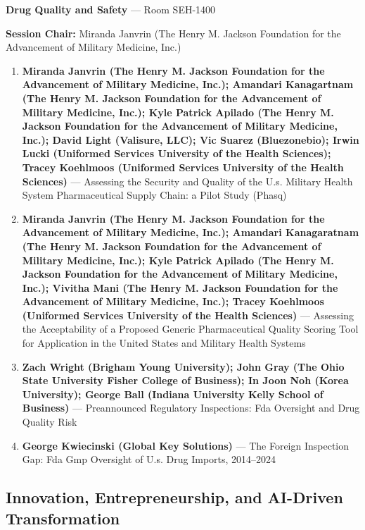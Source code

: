 \documentclass[
  10pt,
  letterpaper,
  DIV=11,
  numbers=noendperiod]{scrartcl}
\begin{document}
\textbf{Drug Quality and Safety} --- Room SEH-1400

\textbf{Session Chair:} Miranda Janvrin (The Henry M. Jackson Foundation
for the Advancement of Military Medicine, Inc.)

\begin{enumerate}
\def\labelenumi{\arabic{enumi}.}
\item
  \textbf{Miranda Janvrin (The Henry M. Jackson Foundation for the
  Advancement of Military Medicine, Inc.); Amandari Kanagartnam (The
  Henry M. Jackson Foundation for the Advancement of Military Medicine,
  Inc.); Kyle Patrick Apilado (The Henry M. Jackson Foundation for the
  Advancement of Military Medicine, Inc.); David Light (Valisure, LLC);
  Vic Suarez (Bluezonebio); Irwin Lucki (Uniformed Services University
  of the Health Sciences); Tracey Koehlmoos (Uniformed Services
  University of the Health Sciences)} --- Assessing the Security and
  Quality of the U.s. Military Health System Pharmaceutical Supply
  Chain: a Pilot Study (Phasq)
\item
  \textbf{Miranda Janvrin (The Henry M. Jackson Foundation for the
  Advancement of Military Medicine, Inc.); Amandari Kanagaratnam (The
  Henry M. Jackson Foundation for the Advancement of Military Medicine,
  Inc.); Kyle Patrick Apilado (The Henry M. Jackson Foundation for the
  Advancement of Military Medicine, Inc.); Vivitha Mani (The Henry M.
  Jackson Foundation for the Advancement of Military Medicine, Inc.);
  Tracey Koehlmoos (Uniformed Services University of the Health
  Sciences)} --- Assessing the Acceptability of a Proposed Generic
  Pharmaceutical Quality Scoring Tool for Application in the United
  States and Military Health Systems
\item
  \textbf{Zach Wright (Brigham Young University); John Gray (The Ohio
  State University Fisher College of Business); In Joon Noh (Korea
  University); George Ball (Indiana University Kelly School of
  Business)} --- Preannounced Regulatory Inspections: Fda Oversight and
  Drug Quality Risk
\item
  \textbf{George Kwiecinski (Global Key Solutions)} --- The Foreign
  Inspection Gap: Fda Gmp Oversight of U.s. Drug Imports, 2014--2024
\end{enumerate}

\subsection{\texorpdfstring{\textcolor{innovation}{Innovation, Entrepreneurship, and AI-Driven Transformation}}{}}\label{section-9}
\end{document}
